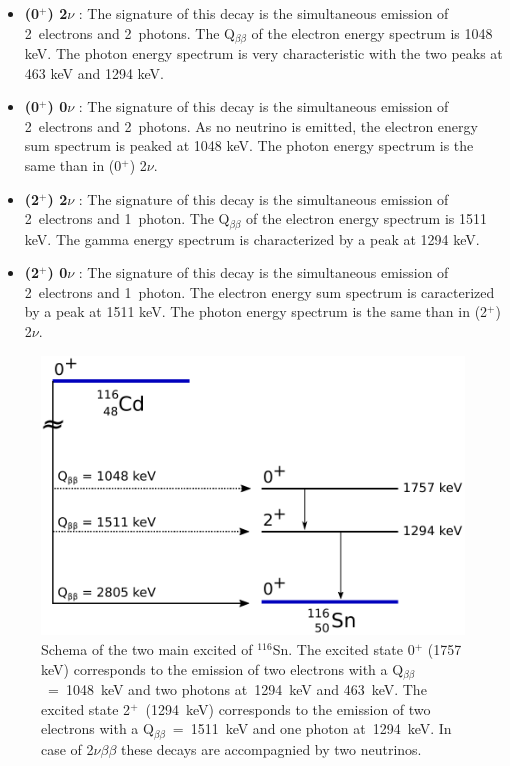 \documentclass[main.tex]{subfiles}
\begin{document}
\begin{itemize}
\item \textbf{(0$^+$) 2$\nu$} : The signature of this decay is the simultaneous emission of 2~electrons and 2~photons. The Q$_{\beta \beta}$ of the electron energy spectrum is 1048 keV. The photon energy spectrum is very characteristic with the two peaks at 463 keV and 1294 keV.

\item \textbf{(0$^+$) 0$\nu$} : The signature of this decay is the simultaneous emission of 2~electrons and 2~photons. As no neutrino is emitted, the electron energy sum spectrum is peaked at 1048 keV. The photon energy spectrum is the same than in (0$^+$) 2$\nu$.

\item \textbf{(2$^+$) 2$\nu$} : The signature of this decay is the simultaneous emission of 2~electrons and 1~photon. The Q$_{\beta \beta}$ of the electron energy spectrum is 1511 keV. The gamma energy spectrum is characterized by a peak at 1294 keV.

\item \textbf{(2$^+$) 0$\nu$} : The signature of this decay is the simultaneous emission of 2~electrons and 1~photon. The electron energy sum spectrum is caracterized by a peak at 1511 keV. The photon energy spectrum is the same than in (2$^+$) 2$\nu$.
\end{itemize}



\begin{figure} [h!]
\begin{center}
\includegraphics[scale=0.60]{pictures/Chap6/SchemaCdExcitedState.pdf}
\end{center}
\caption{Schema of the two main excited of $^{\text{116}}$Sn. The excited state 0$^+$ (1757 keV) corresponds to the emission of two electrons with a Q$_{\beta\beta}$~=~1048~keV and two photons at~1294~keV and 463~keV. The excited state 2$^+$~(1294~keV) corresponds to the emission of two electrons with a Q$_{\beta\beta}$~=~1511~keV and one photon at~1294~keV. In case of 2$\nu\beta\beta$ these decays are accompagnied by two neutrinos.}
\label{SchemaExcitedState}
\end{figure}
\end{document}
